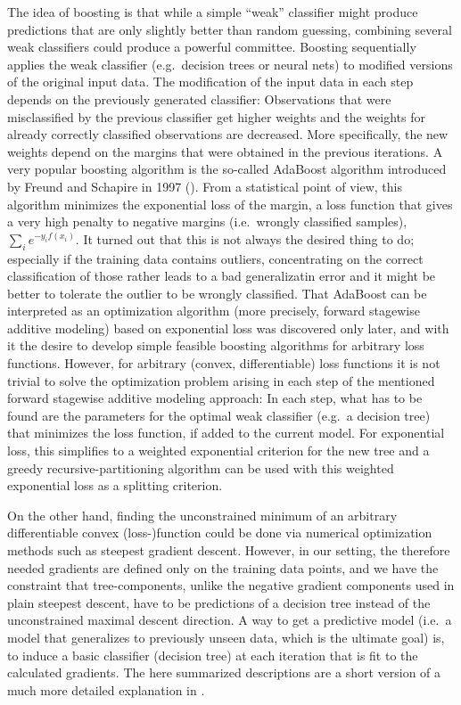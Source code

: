 The idea of boosting is that while a simple ``weak'' classifier might produce predictions that are only slightly better than random guessing, combining several weak classifiers could produce a powerful committee. 
Boosting sequentially applies the weak classifier (e.g.\ decision trees or neural nets) to modified versions of the original input data. 
The modification of the input data in each step depends on the previously generated classifier: Observations that were misclassified by the previous classifier get higher weights and the weights for already correctly classified observations are decreased. More specifically, the new weights depend on the margins that were obtained in the previous iterations. 
A very popular boosting algorithm is the so-called AdaBoost algorithm introduced by Freund and Schapire in 1997 (\cite{freund1997decision}). 
From a statistical point of view, this algorithm minimizes the exponential loss of the margin, a loss function that gives a very high penalty to negative margins (i.e.\ wrongly classified samples),$\sum_i e^{-y_i f(x_i)}$. 
It turned out that this is not always the desired thing to do; especially if the training data contains outliers, concentrating on the correct classification of those rather leads to a bad generalizatin error and it might be better to tolerate the outlier to be wrongly classified. 
That AdaBoost can be interpreted as an optimization algorithm (more precisely, forward stagewise additive modeling) based on exponential loss was discovered only later, and with it the desire to develop simple feasible boosting algorithms for arbitrary loss functions. 
However, for arbitrary (convex, differentiable) loss functions it is not trivial to solve the optimization problem arising in each step of the mentioned forward stagewise additive modeling approach: 
In each step, what has to be found are the parameters for the optimal weak classifier (e.g.\ a decision tree) that minimizes the loss function, if added to the current model. 
For exponential loss, this simplifies to a weighted exponential criterion for the new tree and a greedy recursive-partitioning algorithm can be used with this weighted exponential loss as a splitting criterion. 

On the other hand, finding the unconstrained minimum of an arbitrary differentiable convex (loss-)function could be done via numerical optimization methods such as steepest gradient descent. 
However, in our setting, the therefore needed gradients are defined only on the training data points, and we have the constraint that tree-components, unlike the negative gradient components used in plain steepest descent, have to be predictions of a decision tree instead of the unconstrained maximal descent direction. 
A way to get a predictive model (i.e.\ a model that generalizes to previously unseen data, which is the ultimate goal) is, to induce a basic classifier (decision tree) at each iteration that is fit to the calculated gradients. 
The here summarized descriptions are a short version of a much more detailed explanation in \cite{friedman2009elements}.

